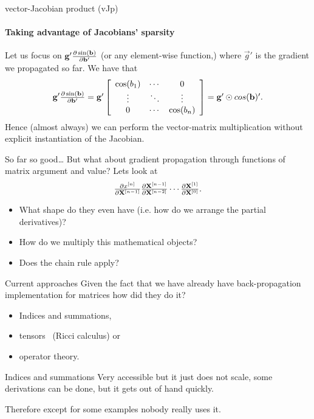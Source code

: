 \documentclass[noamsthm]{beamer}
\begin{document}
\begin{frame}{vector-Jacobian product (vJp)}
\framesubtitle{Taking advantage of Jacobians' sparsity}
Let us focus on \(\mathbf{g}' \textstyle\frac{\partial\sin(\mathbf{b})}{\partial\mathbf{b}'}\) (or any
element-wise function,) where \(\vec g'\) is the gradient we propagated so far.
We have that \[
\mathbf{g}' \textstyle\frac{\partial\sin(\mathbf{b})}{\partial\mathbf{b}'}
= \mathbf{g}' \left[\begin{array}{ccc}
    \cos(b_1) & \cdots & 0 \\
    \vdots & \ddots & \vdots \\
    0 & \cdots & \cos(b_n)
\end{array}\right]
= \mathbf{g}' \odot cos(\mathbf{b})'.
\]
Hence (almost always) we can perform the vector-matrix multiplication without
explicit instantiation of the Jacobian.
\end{frame}

\begin{frame}{So far so good\dots}
But what about gradient propagation through functions of matrix argument and value?
Lets look at
\[\textstyle\frac{\partial x^{[n]}}{\partial\mathbf{X}^{[n-1]}} \textstyle\frac{\partial\mathbf{X}^{[n-1]}}{\partial\mathbf{X}^{[n-2]}}
\cdots \textstyle\frac{\partial\mathbf{X}^{[1]}}{\partial\mathbf{X}^{[0]}}.\]
\begin{itemize}
\item What shape do they even have (i.e. how do we arrange the partial derivatives)?
\item How do we multiply this mathematical objects?
\item Does the chain rule apply?
\end{itemize}
\end{frame}

\begin{frame}{Current approaches}
Given the fact that we have already have back-propagation implementation for matrices how did they do it?
\begin{itemize}
\item Indices and summations,
\item tensors~\cite{laue2018} (Ricci calculus) or
\item operator theory.
\end{itemize}
\end{frame}

\begin{frame}{Indices and summations}
Very accessible but it just does not scale, some derivations can be done, but it
gets out of hand quickly.

Therefore except for some examples nobody really uses it.
\end{frame}
\end{document}
